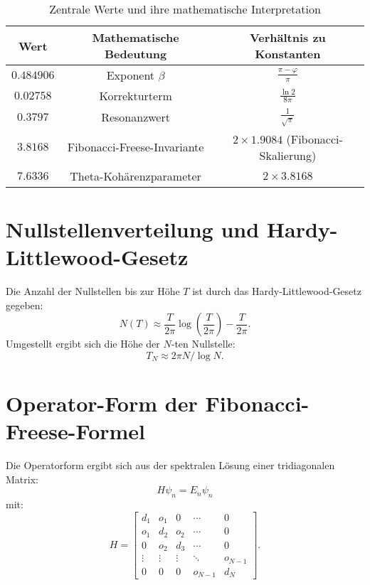 \documentclass[a4paper,12pt]{article}
\begin{document}
\begin{table}[h]
\centering
\begin{tabular}{ccc}
\toprule
\textbf{Wert} & \textbf{Mathematische Bedeutung} & \textbf{Verhältnis zu Konstanten} \\
\midrule
$0.484906$ & Exponent $\beta$ & $\frac{\pi - \varphi}{\pi}$ \\
$0.02758$ & Korrekturterm & $\frac{\ln 2}{8\pi}$ \\
$0.3797$ & Resonanzwert & $\frac{1}{\sqrt{\pi}}$ \\
$3.8168$ & Fibonacci-Freese-Invariante & $2 \times 1.9084$ (Fibonacci-Skalierung) \\
$7.6336$ & Theta-Kohärenzparameter & $2 \times 3.8168$ \\
\bottomrule
\end{tabular}
\caption{Zentrale Werte und ihre mathematische Interpretation}
\end{table}

\section{Nullstellenverteilung und Hardy-Littlewood-Gesetz}
Die Anzahl der Nullstellen bis zur Höhe $T$ ist durch das Hardy-Littlewood-Gesetz gegeben:
\begin{equation}
N(T) \approx \frac{T}{2\pi} \log \left( \frac{T}{2\pi} \right) - \frac{T}{2\pi}.
\end{equation}
Umgestellt ergibt sich die Höhe der $N$-ten Nullstelle:
\begin{equation}
T_N \approx 2\pi N / \log N.
\end{equation}

\section{Operator-Form der Fibonacci-Freese-Formel}
Die Operatorform ergibt sich aus der spektralen Lösung einer tridiagonalen Matrix:
\begin{equation}
H \psi_n = E_n \psi_n
\end{equation}
mit:
\begin{equation}
H = \begin{bmatrix}
d_1 & o_1 & 0 & \cdots & 0 \\
o_1 & d_2 & o_2 & \cdots & 0 \\
0 & o_2 & d_3 & \cdots & 0 \\
\vdots & \vdots & \vdots & \ddots & o_{N-1} \\
0 & 0 & 0 & o_{N-1} & d_N
\end{bmatrix}.
\end{equation}
\end{document}
